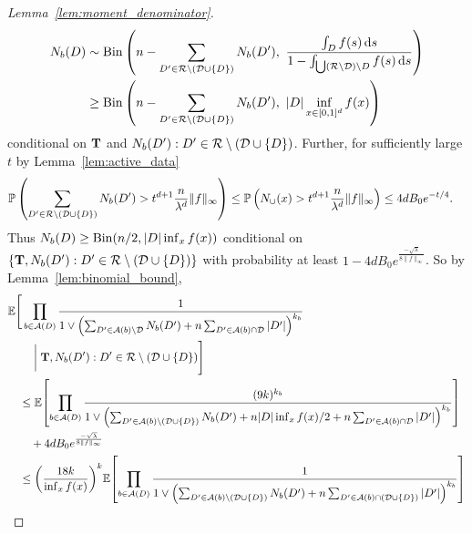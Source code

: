 \begin{proof}[Lemma~\ref{lem:moment_denominator}]
  \begin{align*}
    N_b(D)
    &\sim \operatorname{Bin}\left(
      n - \sum_{D' \in \mathcal{R} \setminus (\mathcal{D} \cup \{D\})} N_b(D'), \
      \frac{\int_{D} f(s) \,\mathrm{d}s}
      {1 - \int_{\bigcup \left( \mathcal{R} \setminus \mathcal{D} \right) \setminus D}
      f(s) \,\mathrm{d}s}
    \right) \\
    &\geq \operatorname{Bin}\left(
      n - \sum_{D' \in \mathcal{R} \setminus (\mathcal{D} \cup \{D\})} N_b(D'), \
      |D| \inf_{x \in [0,1]^d} f(x)
    \right)
  \end{align*}
  conditional on $\mathbf{T}$ and
  $N_b(D') : D' \in \mathcal{R} \setminus (\mathcal{D} \cup \{D\})$.
  Further, for sufficiently large $t$
  by Lemma~\ref{lem:active_data}
  \begin{align*}
    \mathbb{P} \left(
      \sum_{D' \in \mathcal{R} \setminus (\mathcal{D} \cup \{D\})} N_b(D')
    > t^{d+1} \frac{n}{\lambda^d} \|f\|_\infty \right)
    &\leq
    \mathbb{P} \left( N_{\cup}(x) > t^{d+1}
      \frac{n}{\lambda^d}
      \|f\|_\infty
    \right)
    \leq
    4 d B_0 e^{-t/4}.
  \end{align*}
  Thus
  $N_b(D) \geq \operatorname{Bin}(n/2, |D| \inf_x f(x))$
  conditional on
  $\left\{ \mathbf{T}, N_b(D') : D' \in \mathcal{R} \setminus (\mathcal{D} \cup \{D\}) \right\}$
  with probability at least
  $1 - 4 d B_0 e^{\frac{-\sqrt \lambda}{8 \|f\|_\infty}}$.
  So by Lemma~\ref{lem:binomial_bound},
  \begin{align*}
    &\E \Bigg[
      \prod_{b \in \cA(D)}
      \frac{1}{
        1 \vee \left(
          \sum_{D' \in \cA(b) \setminus \cD}
          N_b(D')
          + n \sum_{D' \in \cA(b) \cap \cD}
          |D'|
        \right)^{k_b}
      } \\
      &\qquad
      \biggm|
      \bT,
      N_b(D') : D' \in \cR \setminus (\cD \cup \{D\})
    \Bigg] \\
    &\quad\leq
    \E \! \left[
      \prod_{b \in \cA(D)}
      \frac{(9k)^{k_b}}{
        1 \vee \left(
          \sum_{D' \in \cA(b) \setminus (\cD \cup \{D\})}
          N_b(D')
          + n |D| \inf_x f(x) / 2
          + n \sum_{D' \in \cA(b) \cap \cD}
          |D'|
      \right)^{k_b}}
    \right] \\
    &\qquad+
    4 d B_0 e^{\frac{-\sqrt \lambda}{8 \|f\|_\infty}} \\
    &\quad\leq
    \left( \frac{18k}{\inf_x f(x)} \right)^k
    \! \E \! \left[
      \prod_{b \in \cA(D)}
      \frac{1}{
        1 \vee \left(
          \sum_{D' \in \cA(b) \setminus (\cD \cup \{D\})}
          N_b(D')
          + n \sum_{D' \in \cA(b) \cap (\cD \cup \{D\})}
          |D'|
      \right)^{k_b}}
    \right] \\

\end{align*}
\end{proof}
